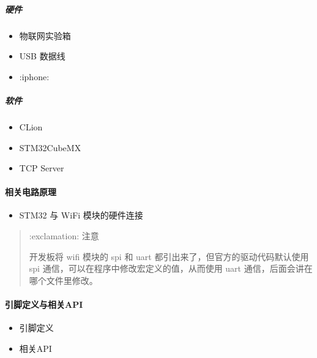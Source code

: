 \documentclass[a4paper,12pt,english]{sphinxmanual}
\begin{document}
\subparagraph{硬件}
\label{\detokenize{exp-stm32/wifi/tcp-over-wifi:id3}}\begin{itemize}
\item {} 
\sphinxAtStartPar
物联网实验箱

\item {} 
\sphinxAtStartPar
USB 数据线

\item {} 
\sphinxAtStartPar
:iphone:

\end{itemize}


\subparagraph{软件}
\label{\detokenize{exp-stm32/wifi/tcp-over-wifi:id4}}\begin{itemize}
\item {} 
\sphinxAtStartPar
CLion

\item {} 
\sphinxAtStartPar
STM32CubeMX

\item {} 
\sphinxAtStartPar
TCP Server

\end{itemize}


\paragraph{相关电路原理}
\label{\detokenize{exp-stm32/wifi/tcp-over-wifi:id5}}\begin{itemize}
\item {} 
\sphinxAtStartPar
STM32 与 WiFi 模块的硬件连接

\end{itemize}

\sphinxAtStartPar
{}
\begin{quote}

\sphinxAtStartPar
:exclamation: 注意

\sphinxAtStartPar
开发板将 wifi 模块的 spi 和 uart 都引出来了，但官方的驱动代码默认使用 spi 通信，可以在程序中修改宏定义的值，从而使用 uart 通信，后面会讲在哪个文件里修改。
\end{quote}


\paragraph{引脚定义与相关API}
\label{\detokenize{exp-stm32/wifi/tcp-over-wifi:api}}\begin{itemize}
\item {} 
\sphinxAtStartPar
引脚定义

\item {} 
\sphinxAtStartPar
相关API

\end{itemize}
\end{document}
